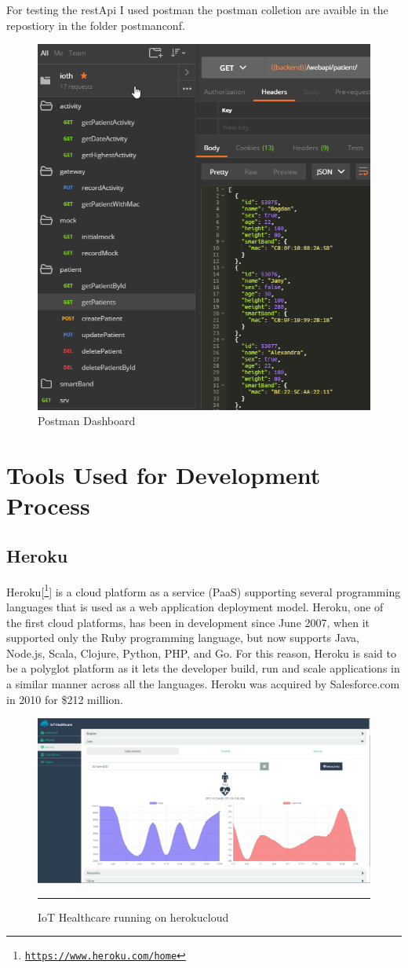 For testing the restApi I used postman the postman colletion are avaible in the repostiory in the folder postmanconf.
\begin{figure}[h]
	\centering
	\includegraphics[width=0.7\linewidth]{images/postman}
	\caption{Postman Dashboard}
	\label{fig:postman}
\end{figure}

\section{Tools Used for Development Process}
\subsection{Heroku}
Heroku[\footnote{\href{https://www.heroku.com/home}{\texttt{https://www.heroku.com/home}}}] is a cloud platform as a service (PaaS) supporting several programming languages that is used as a web application deployment model. Heroku, one of the first cloud platforms, has been in development since June 2007, when it supported only the Ruby programming language, but now supports Java, Node.js, Scala, Clojure, Python, PHP, and Go. For this reason, Heroku is said to be a polyglot platform as it lets the developer build, run and scale applications in a similar manner across all the languages. Heroku was acquired by Salesforce.com in 2010 for \$212 million.
\begin{figure}[h!]
	\centering
	\includegraphics[width=1\textwidth]{./images/iothheroku}
	\rule{1\textwidth}{1pt}
	\caption{IoT Healthcare running on herokucloud}
	\label{fig:iothoh}
\end{figure}
